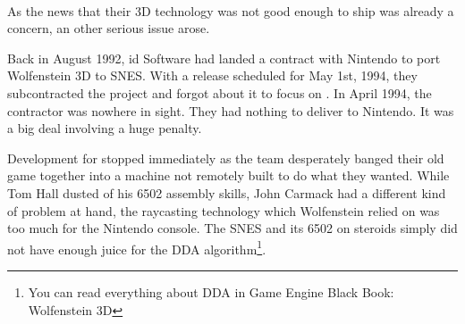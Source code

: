 \\
\par
{}%
\label{HUD_screenshot}
\par
As the news that their 3D technology was not good enough to ship was already a concern, an other serious issue arose.\\
\par
Back in August 1992, id Software had landed a contract with Nintendo to port Wolfenstein 3D to SNES. With a release scheduled for May 1st, 1994, they subcontracted the project and forgot about it to focus on \doom. In April 1994, the contractor was nowhere in sight. They had nothing to deliver to Nintendo. It was a big deal involving a huge penalty.\\
\par
 Development for \doom{} stopped immediately as the team desperately banged their old game together into a machine not remotely built to do what they wanted. While Tom Hall dusted of his 6502 assembly skills, John Carmack had a different kind of problem at hand, the raycasting technology which Wolfenstein relied on was too much for the Nintendo console. The SNES and its 6502 on steroids simply did not have enough juice for the DDA algorithm\footnote{You can read everything about DDA in Game Engine Black Book: Wolfenstein 3D}.\\%
\par



